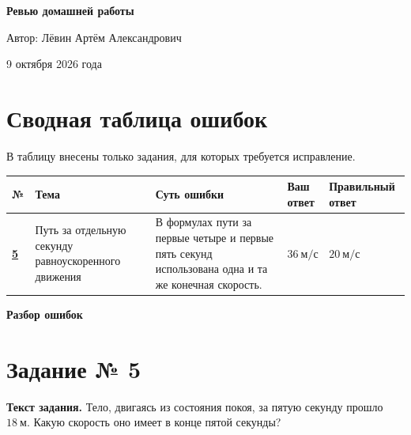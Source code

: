\documentclass[12pt,a4paper]{article}
\begin{document}
\begin{titlepage}
\centering
\vspace*{\fill}
{\Huge\bfseries Ревью домашней работы\par}
\vspace{1.7cm}
{\Large Автор: Лёвин Артём Александрович\par}
\vspace{0.75cm}
{\large 9 октября 2026 года\par}
\vspace*{\fill}
\vspace{0.8cm}
\end{titlepage}

\newpage
\section*{Сводная таблица ошибок}
В таблицу внесены только задания, для которых требуется исправление.

\small
\begin{tabular}{@{}p{1.0cm}p{3.2cm}p{4.9cm}p{2.65cm}p{2.7cm}@{}}
\toprule
\textbf{№} & \textbf{Тема} & \textbf{Суть ошибки} & \textbf{Ваш ответ} & \textbf{Правильный ответ} \\
\midrule
\hyperref[task:5]{\textbf{5}} & Путь за отдельную секунду равноускоренного движения & В формулах пути за первые четыре и первые пять секунд использована одна и та же конечная скорость. & $36\ \text{м/с}$ & $20\ \text{м/с}$ \\
\bottomrule
\end{tabular}
\normalsize

\newpage
\thispagestyle{empty}
\vspace*{\fill}
\begin{center}
{\Huge\bfseries Разбор ошибок}
\end{center}
\vspace*{\fill}

\newpage
{}\label{task:5}
\section*{Задание № 5}

\textbf{Текст задания.} Тело, двигаясь из состояния покоя, за пятую секунду прошло $18\ \text{м}$. Какую скорость оно имеет в конце пятой секунды?
\end{document}
